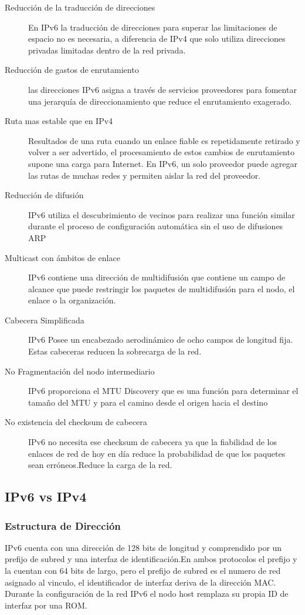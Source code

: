 \documentclass[11pt,a4paper]{article}
\begin{document}
\begin{description}
\item[Reducción de la traducción de direcciones] En IPv6 la traducción de direcciones para superar 
las limitaciones de espacio no es necesaria, a diferencia de IPv4 que solo utiliza direcciones 
privadas limitadas dentro de la red privada.
\item[Reducción de gastos de enrutamiento] las direcciones IPv6 asigna a través de servicios 
proveedores para fomentar una jerarquía de direccionamiento que reduce el enrutamiento exagerado.
\item[Ruta mas estable que  en IPv4]Resultados de una ruta cuando un enlace fiable es repetidamente 
retirado y volver a ser advertido, el procesamiento de estos cambios de enrutamiento supone una 
carga para Internet. En IPv6, un solo proveedor puede agregar las rutas de muchas redes y permiten 
aislar la red del proveedor.
\item[Reducción de difusión] IPv6  utiliza el descubrimiento de vecinos para realizar una función 
similar durante el proceso de configuración automática sin el uso de difusiones ARP
\item[Multicast con ámbitos de enlace] IPv6 contiene una dirección de multidifusión que contiene un 
campo de alcance que puede restringir los paquetes de multidifusión para el nodo, el enlace o la 
organización.
\item [Cabecera Simplificada] IPv6 Posee un encabezado aerodinámico de ocho campos de longitud 
fija. Estas cabeceras reducen la sobrecarga de la red.
\item[No Fragmentación del nodo intermediario]IPv6 proporciona el MTU Discovery que es una función 
para determinar el tamaño del MTU y para el camino desde el origen hacia el destino
\item[No existencia del checksum de cabecera]IPv6 no necesita ese checksum de cabecera ya que la 
fiabilidad de los enlaces de red de hoy en día reduce la probabilidad de que los paquetes sean 
erróneos.Reduce la carga de la red.
\end{description}

\subsection{IPv6 vs IPv4}
\subsubsection{Estructura de Dirección}
IPv6 cuenta con una dirección de 128 bits de longitud y comprendido por un prefijo de subred y una 
interfaz de identificación.En ambos protocolos el prefijo y la cuentan con 64 bits de largo, pero el 
prefijo de subred es el numero de red asignado al vinculo, el identificador de interfaz deriva de la 
dirección MAC. Durante la configuración de la red IPv6 el nodo host remplaza su propia ID de 
interfaz por una ROM.
\end{document}
